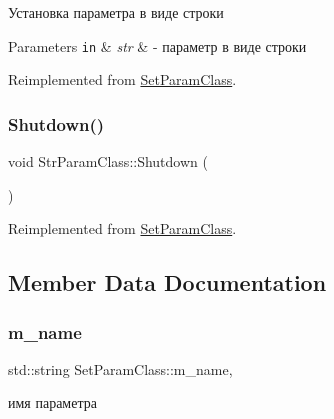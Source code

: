 Установка параметра в виде строки 


\begin{DoxyParams}[1]{Parameters}
\mbox{\tt in}  & {\em str} & -\/ параметр в виде строки \\
\hline
\end{DoxyParams}


Reimplemented from \hyperlink{class_set_param_class_aabba4e8a9b148582f40486e662408bf9}{Set\+Param\+Class}.

\mbox{\label{class_str_param_class_ae84185574803c2877e3b1b21a70fa6ac}} 
\subsubsection{\texorpdfstring{Shutdown()}{Shutdown()}}
{\footnotesize\ttfamily void Str\+Param\+Class\+::\+Shutdown (\begin{DoxyParamCaption}{ }\end{DoxyParamCaption})\hspace{0.3cm}{\ttfamily [virtual]}}



Reimplemented from \hyperlink{class_set_param_class_afdb63374ca8c32f6678ba34e050e9071}{Set\+Param\+Class}.



\subsection{Member Data Documentation}
\mbox{\label{class_set_param_class_aab204889210304af482b414a6f8dbe82}} 
\subsubsection{\texorpdfstring{m\+\_\+name}{m\_name}}
{\footnotesize\ttfamily std\+::string Set\+Param\+Class\+::m\+\_\+name\hspace{0.3cm}{\ttfamily [protected]}, {\ttfamily [inherited]}}



имя параметра 

\mbox{\label{class_str_param_class_a1c67ba23761c9eb69383b0e104562a96}} 
